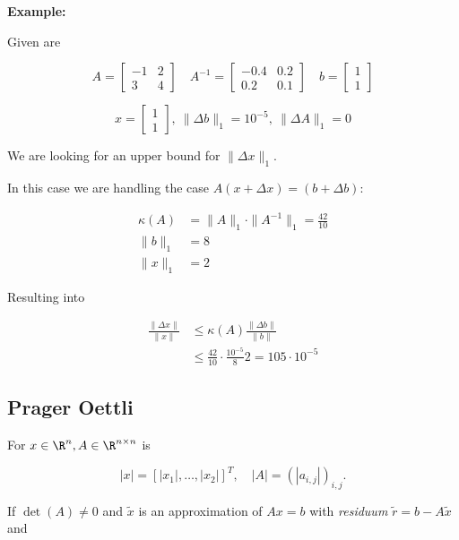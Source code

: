\textbf{Example:}

Given are 

\[
    A = 
    \begin{bmatrix}
        -1 & 2 \\ 
        3 & 4 
    \end{bmatrix}
    \quad 
    A^{-1} = 
    \begin{bmatrix}
        -0.4 & 0.2 \\ 
        0.2 & 0.1 
    \end{bmatrix}
    \quad 
    b = 
    \begin{bmatrix}
        1 \\ 
        1
    \end{bmatrix}
\]

\[
    x =
    \begin{bmatrix}
        1 \\ 
        1
    \end{bmatrix}
    ,\ 
    \|\Delta b\|_1 = 10^{-5}, \ \|\Delta A \|_1 = 0
\]

We are looking for an upper bound for \(\|\Delta x\|_1\).

In this case we are handling the case \(A(x + \Delta x) = (b + \Delta b)\): 

\begin{align*}
    \kappa(A) &= \|A\|_1 \cdot \|A^{-1}\|_1 = \frac{42}{10} \\ 
    \|b\|_1 &= 8 \\
    \|x\|_1 &= 2
\end{align*}

Resulting into 

\begin{align*} 
    \frac{\|\Delta x \|}{\|x\|} &\le \kappa(A) \frac{\|\Delta b \| }{\|b\|} \\
    &\le \frac{42}{10} \cdot \frac{10^{-5}}{8} 2 = 105\cdot 10^{-5}
\end{align*}

\subsection{Prager Oettli}

For \(x \in \R^{n}, A \in \R^{n \times n}\) is 

\[
    |x| = [|x_1|, \dots, |x_2|]^T, \quad |A| = (|a_{i,j}|)_{i,j}.
\]

If \(\det(A) \ne 0\) and \(\tilde{x}\) is an approximation of \(Ax = b\) with \emph{residuum} \(\tilde{r} = b - A\tilde{x}\) and 

